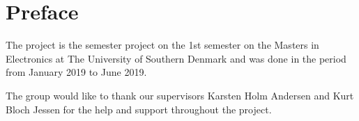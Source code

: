 \section{Preface}
The project is the semester project on the 1st semester on the Masters in Electronics at The University of Southern Denmark and was done in the period from January 2019 to June 2019.


The group would like to thank our supervisors Karsten Holm Andersen and Kurt Bloch Jessen for the help and support throughout the project. 